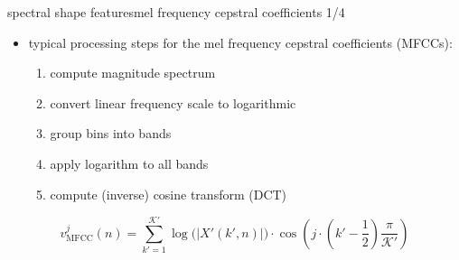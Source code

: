 		\begin{frame}{spectral shape features}{mel frequency cepstral coefficients 1/4}
            \begin{itemize}
                \item   typical processing steps for the mel frequency cepstral coefficients (MFCCs):
                    \begin{enumerate}
                        \item   compute magnitude spectrum
                        \item   convert linear frequency scale to logarithmic
                        \item   group bins into bands
                        \item   apply logarithm to all bands
                        \item   compute (inverse) cosine transform (DCT)
                    \end{enumerate}
            \end{itemize}
            
            \bigskip
			\begin{equation*}
				v^j_{\mathrm{MFCC}}(n)	= \sum\limits_{k' = 1}^{\mathcal{K}'}{\log\big( |X'(k',n)|\big)\cdot \cos\left( j\cdot\left(k'-\frac{1}{2} \right)\frac{\pi}{\mathcal{K}'} \right)}			
			\end{equation*}
        \end{frame}


